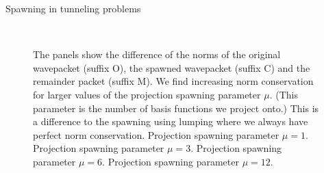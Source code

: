 \begin{chapter}{Spawning in tunneling problems}
\begin{figure}[h!]
{  } \\
  \caption[Difference of the norms of the original and spawned wavepackets using the projection spawning method]{
  The panels show the difference of the norms of the original wavepacket (suffix O), the spawned
  wavepacket (suffix C) and the remainder packet (suffix M). We find increasing norm
  conservation for larger values of the projection spawning parameter $\mu$. (This
  parameter is the number of basis functions we project onto.) This is a difference
  to the spawning using lumping where we always have perfect norm conservation.
   Projection spawning parameter $\mu = 1$.
   Projection spawning parameter $\mu = 3$.
   Projection spawning parameter $\mu = 6$.
   Projection spawning parameter $\mu = 12$.
  \label{fig:tunnel_spawn_project_K50_spawn_norms_drift}
  }
\end{figure}



\end{chapter}
